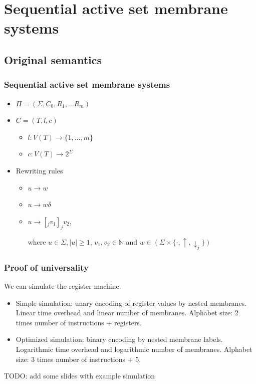 

\section{Sequential active set membrane systems} %
\label{sec:sequential_active_set_membrane_systems}

  \subsection{Original semantics} %
  \label{sub:original_semantics}

    \begin{frame}[t]\frametitle{Sequential active set membrane systems}
      \begin{itemize}
        \item $\Pi = (\Sigma, C_0, R_1, \ldots R_m)$
        \pause
        \item $C = (T, l, c)$
        \begin{itemize}
          \item $l: V(T) \rightarrow \{1, \ldots, m\}$
          \item $c: V(T) \rightarrow 2^\Sigma$
        \end{itemize}
        \pause
        \item Rewriting rules
        \begin{itemize}
          \item $u\rightarrow w$
          \item $u\rightarrow w\delta$
          \item $u\rightarrow [_j v_1]_j v_2$,

          where $u \in \Sigma, |u|\geq 1$, $v_1,v_2\in \mathbb{N}$ and $w\in (\Sigma\times\{\cdot, \uparrow, \downarrow_{j}\})$
        \end{itemize}

      \end{itemize}
    \end{frame}
    \note{}

    \begin{frame}[t]\frametitle{Proof of universality}
      We can simulate the register machine.
      \begin{itemize}
        \item Simple simulation: unary encoding of register values by nested membranes. Linear time overhead and linear number of membranes. Alphabet size: 2 times number of instructions + registers.
        \item Optimized simulation: binary encoding by nested membrane labels. Logarithmic time overhead and logarithmic number of membranes. Alphabet size: 3 times number of instructions + 5.
      \end{itemize}

      TODO: add some slides with example simulation
      
    \end{frame}
    \note{}


